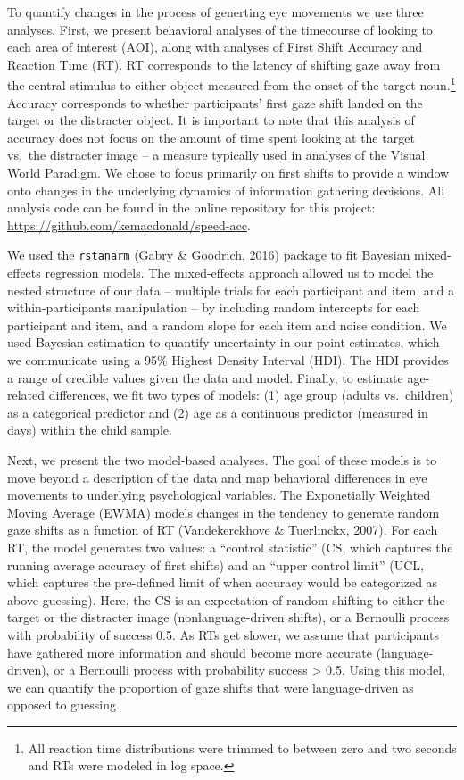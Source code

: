 \documentclass[english,floatsintext,man]{apa6}
\begin{document}
To quantify changes in the process of generting eye movements we use
three analyses. First, we present behavioral analyses of the timecourse
of looking to each area of interest (AOI), along with analyses of First
Shift Accuracy and Reaction Time (RT). RT corresponds to the latency of
shifting gaze away from the central stimulus to either object measured
from the onset of the target noun.\footnote{All reaction time
  distributions were trimmed to between zero and two seconds and RTs
  were modeled in log space.} Accuracy corresponds to whether
participants' first gaze shift landed on the target or the distracter
object. It is important to note that this analysis of accuracy does not
focus on the amount of time spent looking at the target vs.~the
distracter image -- a measure typically used in analyses of the Visual
World Paradigm. We chose to focus primarily on first shifts to provide a
window onto changes in the underlying dynamics of information gathering
decisions. All analysis code can be found in the online repository for
this project: \url{https://github.com/kemacdonald/speed-acc}.

We used the \texttt{rstanarm} (Gabry \& Goodrich, 2016) package to fit
Bayesian mixed-effects regression models. The mixed-effects approach
allowed us to model the nested structure of our data -- multiple trials
for each participant and item, and a within-participants manipulation --
by including random intercepts for each participant and item, and a
random slope for each item and noise condition. We used Bayesian
estimation to quantify uncertainty in our point estimates, which we
communicate using a 95\% Highest Density Interval (HDI). The HDI
provides a range of credible values given the data and model. Finally,
to estimate age-related differences, we fit two types of models: (1) age
group (adults vs.~children) as a categorical predictor and (2) age as a
continuous predictor (measured in days) within the child sample.

Next, we present the two model-based analyses. The goal of these models
is to move beyond a description of the data and map behavioral
differences in eye movements to underlying psychological variables. The
Exponetially Weighted Moving Average (EWMA) models changes in the
tendency to generate random gaze shifts as a function of RT
(Vandekerckhove \& Tuerlinckx, 2007). For each RT, the model generates
two values: a \enquote{control statistic} (CS, which captures the
running average accuracy of first shifts) and an \enquote{upper control
limit} (UCL, which captures the pre-defined limit of when accuracy would
be categorized as above guessing). Here, the CS is an expectation of
random shifting to either the target or the distracter image
(nonlanguage-driven shifts), or a Bernoulli process with probability of
success 0.5. As RTs get slower, we assume that participants have
gathered more information and should become more accurate
(language-driven), or a Bernoulli process with probability success
\textgreater{} 0.5. Using this model, we can quantify the proportion of
gaze shifts that were language-driven as opposed to guessing.
\end{document}
